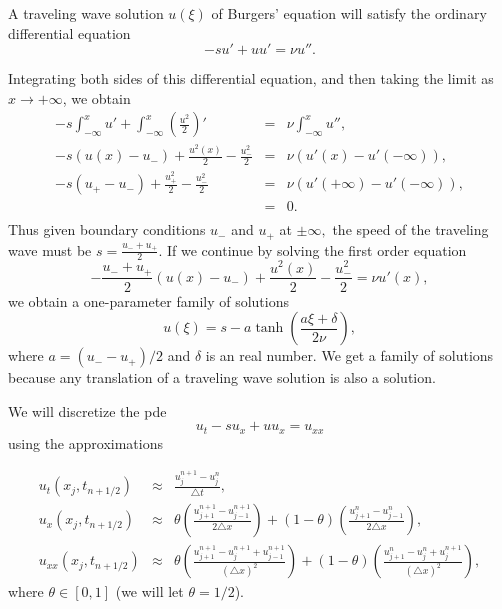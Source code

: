 A traveling wave solution $u(\xi)$ of Burgers' equation will satisfy the ordinary differential equation 
\[ -s u' + u u' = \nu u''.\]

Integrating both sides of this differential equation, and then taking the limit as $x \to +\infty$, we obtain
\begin{eqnarray*}
-s\int_{-\infty}^x u' + \int_{-\infty}^x \left(\frac{u^2}{2}\right)' &=& \nu \int_{-\infty}^x u'',\\	
-s(u(x) - u_-) + \frac{u^2(x)}{2} - \frac{u_-^2}{2} &=& \nu (u'(x) - u'(-\infty)), \\
-s(u_+ - u_-) + \frac{u_+^2}{2} - \frac{u_-^2}{2} &=& \nu (u'(+\infty) - u'(-\infty)), \\
&=& 0.\\
\end{eqnarray*}
Thus given boundary conditions $u_-$ and $u_+$ at $\pm \infty,$ the speed of the traveling wave must be $s = \frac{u_- + u_+}{2}.$ If we continue by solving the first order equation 
\[-\frac{u_- + u_+}{2}(u(x) - u_-) + \frac{u^2(x)}{2} - \frac{u_-^2}{2} = \nu u'(x),\]
we obtain a one-parameter family of solutions \[u(\xi) = s - a \tanh \left(\frac{a\xi + \delta}{2\nu}\right),\]
where $a = (u_- - u_+)/2$ and $\delta$ is an real number. We get a family of solutions because any translation of a traveling wave solution is also a solution. 

We will discretize the pde 
\[u_t -su_x + uu_x = u_{xx}\]
using the approximations
% 
% 

\begin{eqnarray*}
u_t(x_j,t_{n+1/2}) &\approx& \frac{u_j^{n+1}-u_j^n}{\triangle t}, \\
u_x(x_j,t_{n+1/2}) &\approx& \theta \left( \frac{u_{j+1}^{n+1}-u_{j-1}^{n+1}}{2 \triangle x}\right) + (1 - \theta) \left( \frac{u_{j+1}^{n}-u_{j-1}^{n}}{2 \triangle x}\right) ,\\
u_{xx}(x_j,t_{n+1/2}) &\approx& \theta \left( \frac{u_{j+1}^{n+1}- u_{j}^{n+1}+u_{j-1}^{n+1}}{(\triangle x)^2}\right) + (1 - \theta) \left( \frac{u_{j+1}^{n}- u_{j}^{n}+u_{j}^{n+1}}{(\triangle x)^2}\right) ,
\end{eqnarray*}
where $\theta \in [0,1]$ (we will let $\theta = 1/2$).

